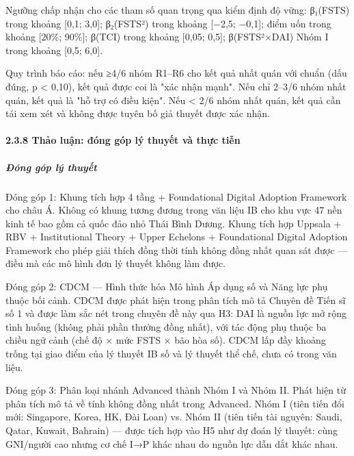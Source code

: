 \documentclass[12pt,a4paper]{article}
\begin{document}
Ngưỡng chấp nhận cho các tham số quan trọng qua kiểm định độ vững:
β₁(FSTS) trong khoảng {[}0,1; 3,0{]}; β₂(FSTS²) trong khoảng {[}−2,5;
−0,1{]}; điểm uốn trong khoảng {[}20\%; 90\%{]}; β(TCI) trong khoảng
{[}0,05; 0,5{]}; β(FSTS²×DAI) Nhóm I trong khoảng {[}0,5; 6,0{]}.

Quy trình báo cáo: nếu ≥4/6 nhóm R1--R6 cho kết quả nhất quán với chuẩn
(dấu đúng, p \textless{} 0,10), kết quả được coi là "xác nhận mạnh". Nếu
chỉ 2--3/6 nhóm nhất quán, kết quả là "hỗ trợ có điều kiện". Nếu
\textless{} 2/6 nhóm nhất quán, kết quả cần tái xem xét và không được
tuyên bố giả thuyết được xác nhận.

\hypertarget{238-thux1ea3o-luux1eadn-ux111uxf3ng-guxf3p-luxfd-thuyux1ebft-vuxe0-thux1ef1c-tiux1ec5n}{%
\paragraph{2.3.8 Thảo luận: đóng góp lý thuyết và thực
tiễn}\label{238-thux1ea3o-luux1eadn-ux111uxf3ng-guxf3p-luxfd-thuyux1ebft-vuxe0-thux1ef1c-tiux1ec5n}}

\hypertarget{ux111uxf3ng-guxf3p-luxfd-thuyux1ebft}{%
\subparagraph{Đóng góp lý
thuyết}\label{ux111uxf3ng-guxf3p-luxfd-thuyux1ebft}}

Đóng góp 1: Khung tích hợp 4 tầng + Foundational Digital Adoption
Framework cho châu Á. Không có khung tương đương trong văn liệu IB cho
khu vực 47 nền kinh tế bao gồm cả quốc đảo nhỏ Thái Bình Dương. Khung
tích hợp Uppsala + RBV + Institutional Theory + Upper Echelons +
Foundational Digital Adoption Framework cho phép giải thích đồng thời
tính không đồng nhất quan sát được --- điều mà các mô hình đơn lý thuyết
không làm được.

Đóng góp 2: CDCM --- Hình thức hóa Mô hình Áp dụng số và Năng lực phụ
thuộc bối cảnh. CDCM được phát hiện trong phân tích mô tả Chuyên đề Tiến
sĩ số 1 và được làm sắc nét trong chuyên đề này qua H3: DAI là nguồn lực
mở rộng tình huống (không phải phần thưởng đồng nhất), với tác động phụ
thuộc ba chiều ngữ cảnh (chế độ × mức FSTS × bão hòa số). CDCM lấp đầy
khoảng trống tại giao điểm của lý thuyết IB số và lý thuyết thể chế,
chưa có trong văn liệu.

Đóng góp 3: Phân loại nhánh Advanced thành Nhóm I và Nhóm II. Phát hiện
từ phân tích mô tả về tính không đồng nhất trong Advanced. Nhóm I (tiên
tiến đổi mới: Singapore, Korea, HK, Đài Loan) vs. Nhóm II (tiên tiến tài
nguyên: Saudi, Qatar, Kuwait, Bahrain) --- được tích hợp vào H5 như dự
đoán lý thuyết: cùng GNI/người cao nhưng cơ chế I→P khác nhau do nguồn
lực dẫn dắt khác nhau.
\end{document}
